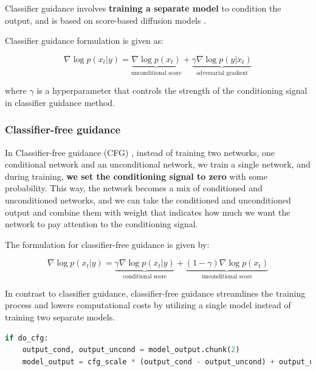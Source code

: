 Classifier guidance \cite{openai_diffusion_beats_gans} involves \textbf{training a separate model} to condition the output, and is based on score-based diffusion models \cite{score_based_generative_modeling}. 

Classifier guidance formulation is given as:

\[
\nabla \log p(x_t | y) = \underbrace{\nabla \log p(x_t)}_{\text{unconditional score}} + \underbrace{\gamma \nabla \log p(y | x_t)}_{\text{adversarial gradient}}
\]

where $\gamma$ is a hyperparameter that controls the strength of the conditioning signal in classifier guidance method.








\subsubsection*{Classifier-free guidance}

In Classifier-free guidance (CFG) \cite{classifier_free_guidance}, instead of training two networks, one conditional network and an unconditional network, we train a single network, and during training, \textbf{we set the conditioning signal to zero} with some probability. This way, the network becomes a mix of conditioned and unconditioned networks, and we can take the conditioned and unconditioned output and combine them with weight that indicates how much we want the network to pay attention to the conditioning signal. 

The formulation for classifier-free guidance is given by:

\[
\nabla \log p(x_t | y) = \underbrace{\gamma \nabla \log p(x_t | y)}_{\text{conditional score}} + \underbrace{(1 - \gamma) \nabla \log p(x_t)}_{\text{unconditional score}}
\]

In contrast to classifier guidance, classifier-free guidance streamlines the training process and lowers computational costs by utilizing a single model instead of training two separate models.

\begin{lstlisting}[language=Python, caption={Classifier-free guidance (CFG) in Stable Diffusion.}, label={lst:cfg_stable_diffusion}]
if do_cfg:
    output_cond, output_uncond = model_output.chunk(2)
    model_output = cfg_scale * (output_cond - output_uncond) + output_uncond
\end{lstlisting}

